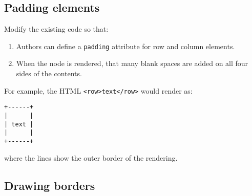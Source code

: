 \documentclass[krantzl]{krantz}
\begin{document}
\subsection*{Padding elements}


Modify the existing code so that:

\begin{enumerate}

\item 

Authors can define a \texttt{padding} attribute for row and column elements.



\item 

When the node is rendered, that many blank spaces are added on all four sides of the contents.



\end{enumerate}


\noindent For example, the HTML \texttt{<row>text</row>} would render as:

\begin{lstlisting}[frame=single,frameround=tttt]
+------+
|      |
| text |
|      |
+------+
\end{lstlisting}


\noindent where the lines show the outer border of the rendering.

\subsection*{Drawing borders}
\end{document}

